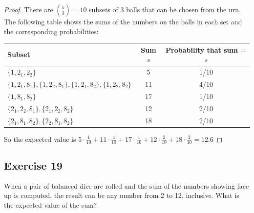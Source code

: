 \documentclass[14pt]{extarticle}
\begin{document}
\begin{proof}
     There are \(\binom{5}{3} = 10\) subsets of 3 balls that can be chosen from the urn. The following table shows the sums of the
     numbers on the balls in each set and the corresponding probabilities:
     \begin{center}
          \begin{tabular}{|l|c|c|}
               \hline
               {\bf Subset}                                                   & {\bf Sum \(s\)} & {\bf Probability that sum = \(s\)} \\
               \hline
               \(\{1, 2_1, 2_2\}\)                                            & 5               & 1/10                               \\
               \hline
               \(\{1,2_1,8_1\}, \{1,2_2,8_1\}, \{1,2_1,8_2\}, \{1,2_2,8_2\}\) & 11              & 4/10                               \\
               \hline
               \(\{1,8_1,8_2\}\)                                              & 17              & 1/10                               \\
               \hline
               \(\{2_1,2_2,8_1\}, \{2_1,2_2,8_2\}\)                           & 12              & 2/10                               \\
               \hline
               \(\{2_1,8_1,8_2\}, \{2_2,8_1,8_2\}\)                           & 18              & 2/10                               \\
               \hline
          \end{tabular}
     \end{center}
     So the expected value is \(5 \cdot \frac{1}{10} + 11 \cdot \frac{4}{10} + 17 \cdot \frac{1}{10} + 12 \cdot \frac{2}{10} +
     18 \cdot \frac{2}{10} = 12.6\)
\end{proof}

\subsection{Exercise 19}
When a pair of balanced dice are rolled and the sum of the numbers showing face up is computed, the result can be any
number from 2 to 12, inclusive. What is the expected value of the sum?
\end{document}
